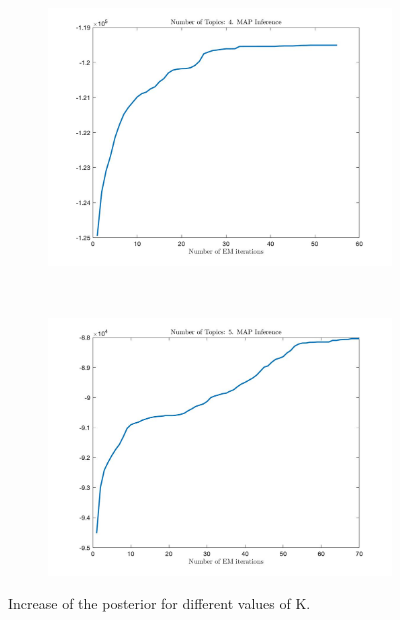 \documentclass[12pt]{article}
\begin{document}
\begin{figure}[ht]
\begin{subfigure}{0.4\textwidth}
		\includegraphics[width=\textwidth]{images/MAP/Q_map_4_topics.jpg}
		\caption{}
		\label{fig:Q_MAP_4}
	\end{subfigure}
	~
	\begin{subfigure}{0.4\textwidth}
	\includegraphics[width=\textwidth]{images/MAP/Q_map_5_topics.jpg}
		\caption{}
		\label{fig:Q_MAP_5}
	\end{subfigure}

	\caption{Increase of the posterior for different values of K.}
	\label{fig:Q_MAP}
\end{figure}
\end{document}
